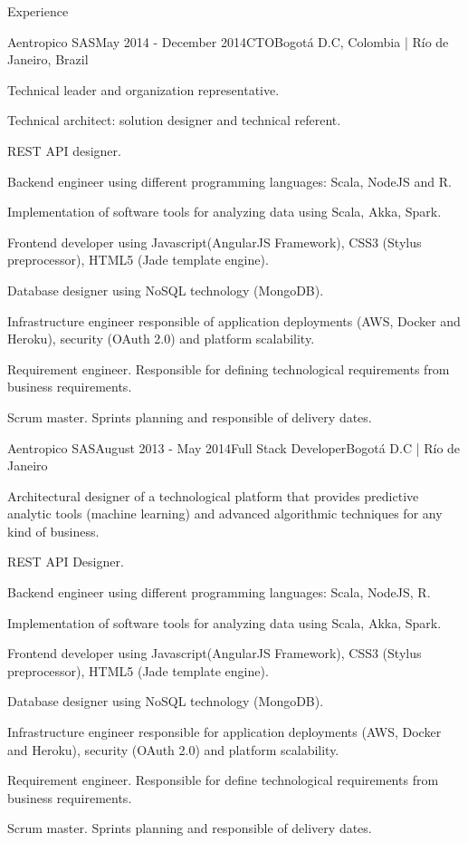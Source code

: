 \documentclass[spanish]{resume}
\begin{document}
\begin{rSection}{Experience}
\begin{rSubsection}{Aentropico SAS}{May 2014 - December 2014}{CTO}{Bogot\'a D.C, Colombia | R\'io de Janeiro, Brazil}
\item Technical leader and organization representative.
\item Technical architect: solution designer and technical referent.
\item REST API designer.
\item Backend engineer using different programming languages: Scala, NodeJS and R.
\item Implementation of software tools for analyzing data using Scala, Akka, Spark.
\item Frontend developer using Javascript(AngularJS Framework), CSS3 (Stylus preprocessor), HTML5 (Jade template engine).
\item Database designer using NoSQL technology (MongoDB).
\item Infrastructure engineer responsible of application deployments (AWS, Docker and Heroku), security (OAuth 2.0) and platform scalability.
\item Requirement engineer. Responsible for defining technological requirements from business requirements.
\item Scrum master. Sprints planning and responsible of delivery dates.
\end{rSubsection}


\begin{rSubsection}{Aentropico SAS}{August 2013 - May 2014}{Full Stack Developer}{Bogot\'a D.C | R\'io de Janeiro}
\item Architectural designer of a technological platform that provides predictive analytic tools (machine learning) and advanced algorithmic techniques for any kind of business.
\item REST API Designer.
\item Backend engineer using different programming languages: Scala, NodeJS, R.
\item Implementation of software tools for analyzing data using Scala, Akka, Spark.
\item Frontend developer using Javascript(AngularJS Framework), CSS3 (Stylus preprocessor), HTML5 (Jade template engine).
\item Database designer using NoSQL technology (MongoDB).
\item Infrastructure engineer responsible for application deployments (AWS, Docker and Heroku), security (OAuth 2.0) and platform scalability.
\item Requirement engineer. Responsible for define technological requirements from business requirements.
\item Scrum master. Sprints planning and responsible of delivery dates.
\end{rSubsection}


\end{rSection}
\end{document}
